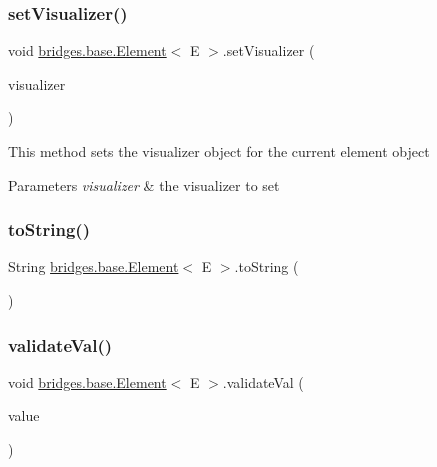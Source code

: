 \subsubsection{\texorpdfstring{set\+Visualizer()}{setVisualizer()}}
{\footnotesize\ttfamily void \hyperlink{classbridges_1_1base_1_1_element}{bridges.\+base.\+Element}$<$ E $>$.set\+Visualizer (\begin{DoxyParamCaption}\item[{\hyperlink{classbridges_1_1base_1_1_element_visualizer}{Element\+Visualizer}}]{visualizer }\end{DoxyParamCaption})}

This method sets the visualizer object for the current element object 
\begin{DoxyParams}{Parameters}
{\em visualizer} & the visualizer to set \\
\hline
\end{DoxyParams}
\hypertarget{classbridges_1_1base_1_1_element_a7dc685e317fd9dc2e73e049a9f907e42}{}\label{classbridges_1_1base_1_1_element_a7dc685e317fd9dc2e73e049a9f907e42} 
\subsubsection{\texorpdfstring{to\+String()}{toString()}}
{\footnotesize\ttfamily String \hyperlink{classbridges_1_1base_1_1_element}{bridges.\+base.\+Element}$<$ E $>$.to\+String (\begin{DoxyParamCaption}{ }\end{DoxyParamCaption})}

\hypertarget{classbridges_1_1base_1_1_element_af1a60f4e6a91d379179f7d56e6dc3829}{}\label{classbridges_1_1base_1_1_element_af1a60f4e6a91d379179f7d56e6dc3829} 
\subsubsection{\texorpdfstring{validate\+Val()}{validateVal()}}
{\footnotesize\ttfamily void \hyperlink{classbridges_1_1base_1_1_element}{bridges.\+base.\+Element}$<$ E $>$.validate\+Val (\begin{DoxyParamCaption}\item[{E}]{value }\end{DoxyParamCaption})\hspace{0.3cm}{\ttfamily [protected]}}

